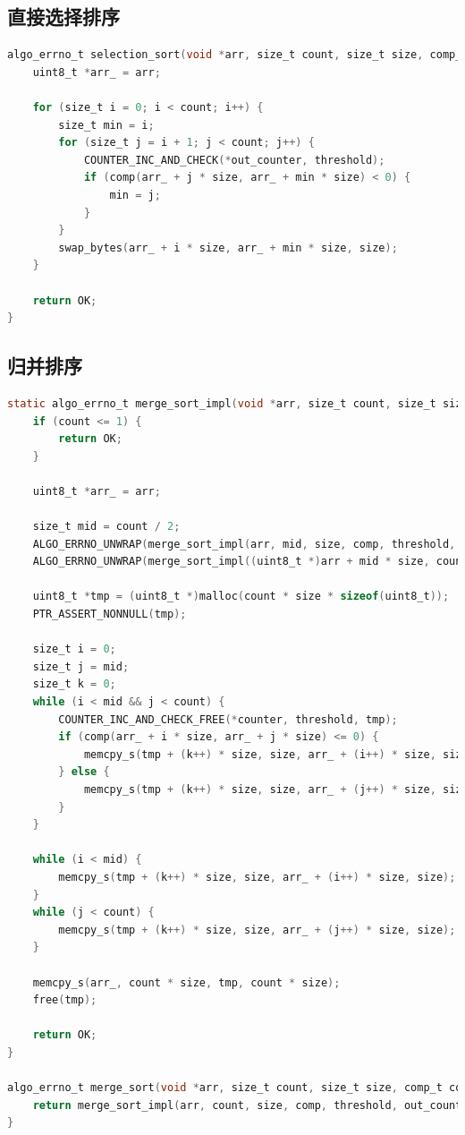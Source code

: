 \documentclass[12pt]{article}
\begin{document}
\subsection{直接选择排序}

\begin{lstlisting}[language=C]
algo_errno_t selection_sort(void *arr, size_t count, size_t size, comp_t comp, uint64_t threshold, uint64_t *out_counter) {
    uint8_t *arr_ = arr;

    for (size_t i = 0; i < count; i++) {
        size_t min = i;
        for (size_t j = i + 1; j < count; j++) {
            COUNTER_INC_AND_CHECK(*out_counter, threshold);
            if (comp(arr_ + j * size, arr_ + min * size) < 0) {
                min = j;
            }
        }
        swap_bytes(arr_ + i * size, arr_ + min * size, size);
    }

    return OK;
}
\end{lstlisting}

\subsection{归并排序}

\begin{lstlisting}[language=C]
static algo_errno_t merge_sort_impl(void *arr, size_t count, size_t size, comp_t comp, uint64_t threshold, uint64_t *counter) {
    if (count <= 1) {
        return OK;
    }

    uint8_t *arr_ = arr;

    size_t mid = count / 2;
    ALGO_ERRNO_UNWRAP(merge_sort_impl(arr, mid, size, comp, threshold, counter));
    ALGO_ERRNO_UNWRAP(merge_sort_impl((uint8_t *)arr + mid * size, count - mid, size, comp, threshold, counter));

    uint8_t *tmp = (uint8_t *)malloc(count * size * sizeof(uint8_t));
    PTR_ASSERT_NONNULL(tmp);

    size_t i = 0;
    size_t j = mid;
    size_t k = 0;
    while (i < mid && j < count) {
        COUNTER_INC_AND_CHECK_FREE(*counter, threshold, tmp);
        if (comp(arr_ + i * size, arr_ + j * size) <= 0) {
            memcpy_s(tmp + (k++) * size, size, arr_ + (i++) * size, size);
        } else {
            memcpy_s(tmp + (k++) * size, size, arr_ + (j++) * size, size);
        }
    }

    while (i < mid) {
        memcpy_s(tmp + (k++) * size, size, arr_ + (i++) * size, size);
    }
    while (j < count) {
        memcpy_s(tmp + (k++) * size, size, arr_ + (j++) * size, size);
    }

    memcpy_s(arr_, count * size, tmp, count * size);
    free(tmp);

    return OK;
}

algo_errno_t merge_sort(void *arr, size_t count, size_t size, comp_t comp, uint64_t threshold, uint64_t *out_counter) {
    return merge_sort_impl(arr, count, size, comp, threshold, out_counter);
}
\end{lstlisting}
\end{document}
